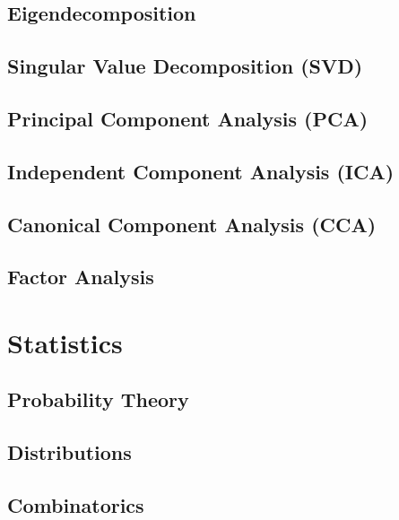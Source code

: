 \documentclass[11pt]{article}
\begin{document}
\subsection{Eigendecomposition}
\subsection{Singular Value Decomposition (SVD)}
\subsection{Principal Component Analysis (PCA)}
\subsection{Independent Component Analysis (ICA)}
\subsection{Canonical Component Analysis (CCA)}
\subsection{Factor Analysis}

\section{Statistics}
\subsection{Probability Theory}
\subsection{Distributions}
\subsection{Combinatorics}
\end{document}

